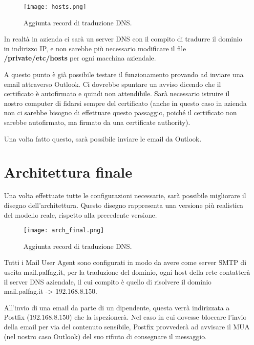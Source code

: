     \begin{figure}[htp]
        \centering
        \texttt{[image: hosts.png]}
        \caption{Aggiunta record di traduzione DNS.}\label{hosts}
    \end{figure}  

    In realtà in azienda ci sarà un server DNS con il compito di tradurre il dominio in indirizzo IP, 
    e non sarebbe più necessario modificare il file \textbf{/private/etc/hosts} per ogni macchina aziendale.


    A questo punto è già possibile testare il funzionamento provando ad inviare una email attraverso Outlook. 
    Ci dovrebbe spuntare un avviso dicendo che il certificato è autofirmato e quindi non attendibile. 
    Sarà necessario istruire il nostro computer di fidarsi sempre del certificato
    (anche in questo caso in azienda non ci sarebbe bisogno di effettuare questo passaggio, poiché 
    il certificato non sarebbe autofirmato, ma firmato da una certificate authority).

    Una volta fatto questo, sarà possibile inviare le email da Outlook.


    \section{Architettura finale}
    Una volta effettuate tutte le configurazioni necessarie, sarà possibile migliorare il disegno dell’architettura. 
    Questo disegno rappresenta una versione più realistica del modello reale, rispetto alla precedente versione.

    \begin{figure}[htp]
        \centering
        \texttt{[image: arch\_final.png]}
        \caption{Aggiunta record di traduzione DNS.}\label{hosts}
    \end{figure} 

    Tutti i Mail User Agent sono configurati in modo da avere come server SMTP di uscita mail.palfag.it, 
    per la traduzione del dominio, ogni host della rete contatterà il server DNS aziendale, il cui compito è
    quello di risolvere il dominio mail.palfag.it -> 192.168.8.150.

    All'invio di una email da parte di un dipendente, questa verrà indirizzata a Postfix (192.168.8.150) che la 
    ispezionerà. Nel caso in cui dovesse bloccare l’invio della email per via del contenuto sensibile, 
    Postfix provvederà ad avvisare il MUA (nel nostro caso Outlook) del suo rifiuto di consegnare il messaggio.

